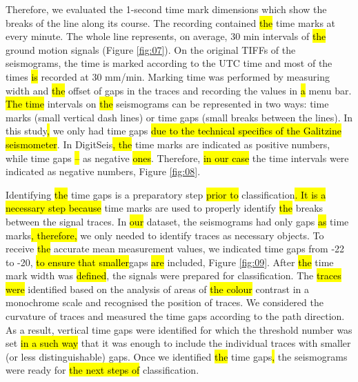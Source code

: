 \documentclass[sensors,article,submit,moreauthors,pdftex]{Definitions/mdpi}
\begin{document}
Therefore, we evaluated the 1-second time mark dimensions which show the breaks of the line along its course. The recording contained \hl{the }time marks at every minute. The whole line represents, on average, 30 min intervals of \hl{the }ground motion signals (Figure \ref{fig:07}). On the original TIFFs of the seismograms, the time is marked according to the \ac{UTC} time and\hl{ }most of the times\hl{ is }recorded at 30 mm/min. Marking time was performed by measuring width and \hl{the }offset of\hl{ }gaps in the traces and recording the values in \hl{a }menu bar. \hl{The time }intervals on \hl{the }seismograms can be represented in two ways: time marks (small vertical dash lines) or time gaps (small breaks between the lines). In this study\hl{, }we only had time gaps \hl{due to the technical specifics of the Galitzine seismometer}. In\hl{ }DigitSeis\hl{, the }time marks are indicated as positive numbers, while time gaps\hl{ -- }as negative \hl{ones}. Therefore, \hl{in our case }the time intervals were indicated as negative numbers, Figure \ref{fig:08}. 

Identifying \hl{the }time gaps is a preparatory step \hl{prior to }classification\hl{. It is a necessary step because }time marks are used to properly identify \hl{the }breaks between the signal traces. In \hl{our }dataset, the seismograms had only gaps \hl{as }time marks\hl{, therefore, }we only needed to identify traces as necessary objects. To receive \hl{the }accurate mean measurement values, we indicated time gaps from -22 to -20, \hl{to ensure that smaller}gaps \hl{are }included, Figure \ref{fig:09}. After \hl{the }time mark width was \hl{defined}, the signals were prepared for classification. The \hl{traces were }identified  based on the analysis of areas of \hl{the colour }contrast in a monochrome\hl{ }scale and recognised the position of traces. We considered the curvature of\hl{ }traces and measured the time gaps according to the path direction. As a result, vertical time gaps were identified for which the threshold number was set \hl{in a such way }that it was enough to include the individual traces with smaller (or less distinguishable) gaps. Once we identified \hl{the }time gaps\hl{, }the seismograms were ready for \hl{the next steps of }classification. 
\end{document}
